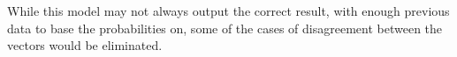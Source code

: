While this model may not always output the correct result, with enough previous
data to base the probabilities on, some of the cases of disagreement between the
vectors would be eliminated.



% 
% 


